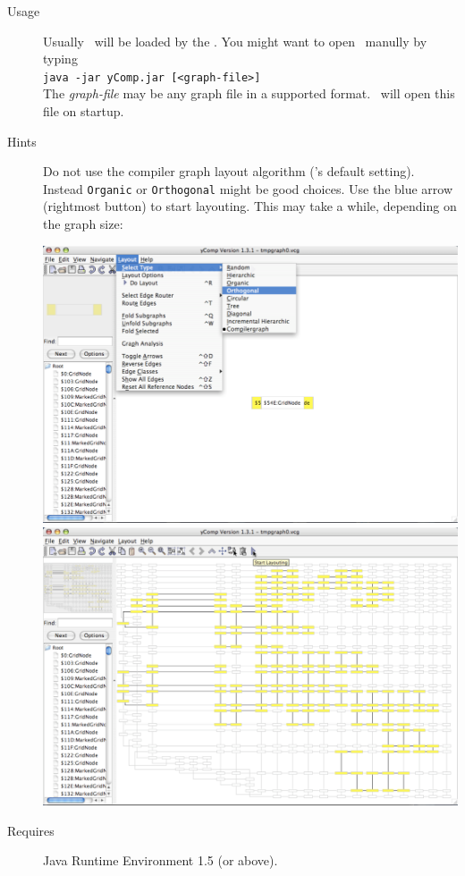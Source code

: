 \begin{description}
  \item[Usage] Usually \yComp\ will be loaded by the \GrShell. You might want to open \yComp\ manully by typing\\
   \texttt{java -jar yComp.jar [<graph-file>]}\\
  The \emph{graph-file} may be any graph file in a supported format. \yComp\ will open this file on startup.
  \item[Hints] Do not use the compiler graph layout algorithm (\yComp's default setting). Instead \texttt{Organic} or \texttt{Orthogonal} might be good choices. Use the blue arrow (rightmost button) to start layouting. This may take a while, depending on the graph size:
\begin{center}
\includegraphics[width=0.45\linewidth]{fig/ycomp1.pdf} \includegraphics[width=0.45\linewidth]{fig/ycomp2.pdf}
\end{center}
  \item[Requires] Java Runtime Environment 1.5 (or above).
\end{description}
